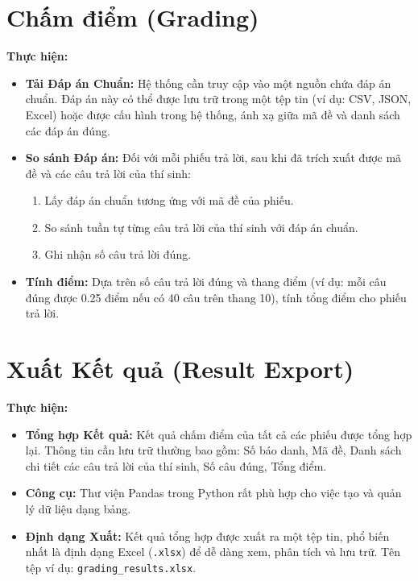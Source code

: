 \section{Chấm điểm (Grading)}
\label{sec:grading}
\textbf{Thực hiện:}
\begin{itemize}
    \item \textbf{Tải Đáp án Chuẩn:} Hệ thống cần truy cập vào một nguồn chứa đáp án chuẩn. Đáp án này có thể được lưu trữ trong một tệp tin (ví dụ: CSV, JSON, Excel) hoặc được cấu hình trong hệ thống, ánh xạ giữa mã đề và danh sách các đáp án đúng.
    \item \textbf{So sánh Đáp án:} Đối với mỗi phiếu trả lời, sau khi đã trích xuất được mã đề và các câu trả lời của thí sinh:
        \begin{enumerate}
            \item Lấy đáp án chuẩn tương ứng với mã đề của phiếu.
            \item So sánh tuần tự từng câu trả lời của thí sinh với đáp án chuẩn.
            \item Ghi nhận số câu trả lời đúng.
        \end{enumerate}
    \item \textbf{Tính điểm:} Dựa trên số câu trả lời đúng và thang điểm (ví dụ: mỗi câu đúng được 0.25 điểm nếu có 40 câu trên thang 10), tính tổng điểm cho phiếu trả lời.
\end{itemize}

\section{Xuất Kết quả (Result Export)}
\label{sec:result_export}
\textbf{Thực hiện:}
\begin{itemize}
    \item \textbf{Tổng hợp Kết quả:} Kết quả chấm điểm của tất cả các phiếu được tổng hợp lại. Thông tin cần lưu trữ thường bao gồm: Số báo danh, Mã đề, Danh sách chi tiết các câu trả lời của thí sinh, Số câu đúng, Tổng điểm.
    \item \textbf{Công cụ:} Thư viện Pandas trong Python rất phù hợp cho việc tạo và quản lý dữ liệu dạng bảng.
    \item \textbf{Định dạng Xuất:} Kết quả tổng hợp được xuất ra một tệp tin, phổ biến nhất là định dạng Excel (\texttt{.xlsx}) để dễ dàng xem, phân tích và lưu trữ. Tên tệp ví dụ: \texttt{grading\_results.xlsx}.
\end{itemize}

